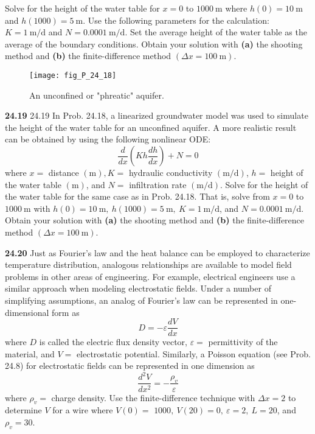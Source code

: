 \documentclass[../main.tex]{subfiles}
\begin{document}
\begin{multicols}{2}
    Solve for the height of the water table for $x=0$ to $1000 \mathrm{~m}$ where $h(0)=10 \mathrm{~m}$ and $h(1000)=5 \mathrm{~m}$. Use the following parameters for the calculation: $K=1 \mathrm{~m} / \mathrm{d}$ and $N=0.0001 \mathrm{~m} / \mathrm{d}$. Set the average height of the water table as the average of the boundary conditions. Obtain your solution with \textbf{(a)} the shooting method and \textbf{(b)} the finite-difference method $(\Delta x=100 \mathrm{~m})$.

    \begin{figure}[H]
        \centering
        \texttt{[image: fig\_P\_24\_18]}
       \caption{\textsf{An unconfined or "phreatic" aquifer.}}\label{fig:fig_P_24_18}
    \end{figure}\vspace{2mm}

    \noindent\textbf{24.19} 24.19 In Prob. 24.18, a linearized groundwater model was used to simulate the height of the water table for an unconfined aquifer. A more realistic result can be obtained by using the following nonlinear ODE:
    $$
    \frac{d}{d x}\left(K h \frac{d h}{d x}\right)+N=0
    $$
    where $x=$ distance $(\mathrm{m}), K=$ hydraulic conductivity $(\mathrm{m} / \mathrm{d})$, $h=$ height of the water table $(\mathrm{m})$, and $N=$ infiltration rate $(\mathrm{m} / \mathrm{d})$. Solve for the height of the water table for the same case as in Prob. 24.18.
    That is, solve from $x=0$ to $1000 \mathrm{~m}$ with $h(0)=10 \mathrm{~m},\ h(1000)=5 \mathrm{~m},\ K=1 \mathrm{~m} / \mathrm{d}$, and $N=0.0001 \mathrm{~m} / \mathrm{d}$. Obtain your solution with \textbf{(a)} the shooting method and \textbf{(b)} the finite-difference method $(\Delta x=100 \mathrm{~m})$.\vspace{2mm}

    \noindent\textbf{24.20} Just as Fourier's law and the heat balance can be employed to characterize temperature distribution, analogous relationships are available to model field problems in other areas of engineering. For example, electrical engineers use a similar approach when modeling electrostatic fields. Under a number of simplifying assumptions, an analog of Fourier's law can be represented in one-dimensional form as
    $$
    D=-\varepsilon \frac{d V}{d x}
    $$
    where $D$ is called the electric flux density vector, $\varepsilon=$ permittivity of the material, and $V=$ electrostatic potential. Similarly, a Poisson equation (see Prob. 24.8) for electrostatic fields can be represented in one dimension as
    $$
    \frac{d^{2} V}{d x^{2}}=-\frac{\rho_{v}}{\varepsilon}
    $$
    where $\rho_{v}=$ charge density. Use the finite-difference technique with $\Delta x=2$ to determine $V$ for a wire where $V(0)=$ $1000,\ V(20)=0,\ \varepsilon=2,\ L=20$, and $\rho_{v}=30$.\vspace{2mm}


\end{multicols}
\end{document}
